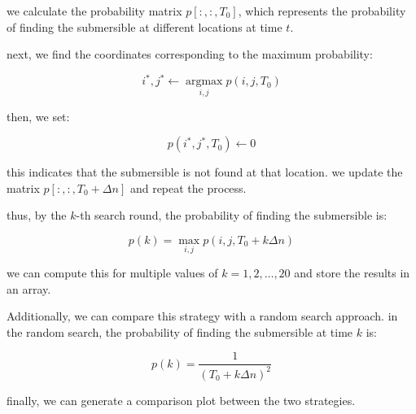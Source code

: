 \noindent we calculate the probability matrix \( p[:,:,T_0] \), which represents the probability of finding the submersible at different locations at time \( t \).

next, we find the coordinates corresponding to the maximum probability:

\[
	i^*, j^* \leftarrow \mathop{\arg\max}\limits_{i,j} p(i,j,T_0)
\]

\noindent then, we set:

\[
	p(i^*, j^*, T_0) \leftarrow 0
\]

this indicates that the submersible is not found at that location. we update the matrix \( p[:,:,T_0+\Delta n] \) and repeat the process.

thus, by the \( k \)-th search round, the probability of finding the submersible is:

\[
	p(k) = \mathop{\max}\limits_{i,j} p(i,j,T_0+k\Delta n)
\]

we can compute this for multiple values of \( k = 1, 2, \dots, 20 \) and store the results in an array.

Additionally, we can compare this strategy with a random search approach. in the random search, the probability of finding the submersible at time \( k \) is:

\[
	p(k) = \frac{1}{(T_0+k\Delta n)^2}
\]

\noindent finally, we can generate a comparison plot between the two strategies.


